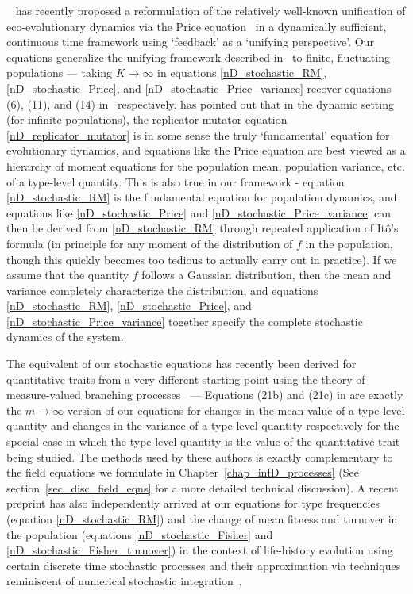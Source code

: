 ~\cite{lion_theoretical_2018} has recently proposed a reformulation of the relatively well-known unification of eco-evolutionary dynamics via the Price equation~\citep{frank_natural_2012, queller_fundamental_2017, luque_mirror_2021} in a dynamically sufficient, continuous time framework using `feedback' as a `unifying perspective'. Our equations generalize the unifying framework described in~\cite{lion_theoretical_2018} to finite, fluctuating populations --- taking $K \to \infty$ in equations \eqref{nD_stochastic_RM}, \eqref{nD_stochastic_Price}, and \eqref{nD_stochastic_Price_variance} recover equations (6), (11), and (14) in~\cite{lion_theoretical_2018} respectively. \cite{lion_theoretical_2018} has pointed out that in the dynamic setting (for infinite populations), the replicator-mutator equation \eqref{nD_replicator_mutator} is in some sense the truly `fundamental' equation for evolutionary dynamics, and equations like the Price equation are best viewed as a hierarchy of moment equations for the population mean, population variance, etc. of a type-level quantity. This is also true in our framework - equation \eqref{nD_stochastic_RM} is the fundamental equation for population dynamics, and equations like \eqref{nD_stochastic_Price} and \eqref{nD_stochastic_Price_variance} can then be derived from \eqref{nD_stochastic_RM} through repeated application of It\^o's formula (in principle for any moment of the distribution of $f$ in the population, though this quickly becomes too tedious to actually carry out in practice). If we assume that the quantity $f$ follows a Gaussian distribution, then the mean and variance completely characterize the distribution,  and equations \eqref{nD_stochastic_RM}, \eqref{nD_stochastic_Price}, and \eqref{nD_stochastic_Price_variance} together specify the complete stochastic dynamics of the system.

The equivalent of our stochastic equations has recently been derived for quantitative traits from a very different starting point using the theory of measure-valued branching processes~\citep{week_white_2021} --- Equations (21b) and (21c) in \cite{week_white_2021} are exactly the $m \to \infty$ version of our equations for changes in the mean value of a type-level quantity and changes in the variance of a type-level quantity respectively for the special case in which the type-level quantity is the value of the quantitative trait being studied. The methods used by these authors is exactly complementary to the field equations we formulate in Chapter~\ref{chap_infD_processes} (See section~\ref{sec_disc_field_eqns} for a more detailed technical discussion). A recent preprint has also independently arrived at our equations for type frequencies (equation \eqref{nD_stochastic_RM}) and the change of mean fitness and turnover in the population (equations \eqref{nD_stochastic_Fisher} and \eqref{nD_stochastic_Fisher_turnover}) in the context of life-history evolution using certain discrete time stochastic processes and their approximation via techniques reminiscent of numerical stochastic integration~\citep{kuosmanen_turnover_2022}.

